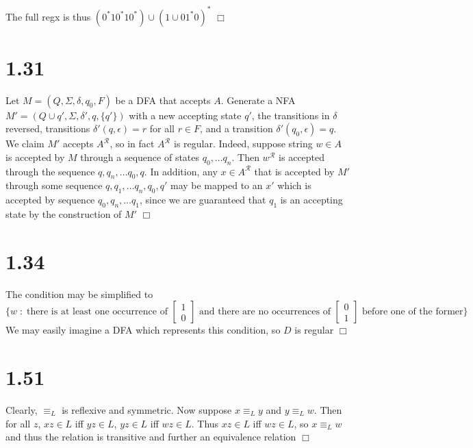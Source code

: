 \documentclass{article}
\begin{document}
\noindent
The full regx is thus $(0^*10^*10^*)\cup(1\cup01^*0)^*$ $\Box$

\section*{1.31}
Let $M = (Q,\Sigma,\delta,q_0,F)$ be a DFA that accepts $A$. Generate a NFA $M' = (Q\cup{q'}, \Sigma, \delta',q,\{q'\})$ with a new accepting state $q'$, the transitions in $\delta$ reversed, transitions $\delta'(q,\epsilon) = r$ for all $r \in F$, and a transition $\delta'(q_0,\epsilon) = q$. We claim $M'$ accepts $A^\mathcal{R}$, so in fact $A^\mathcal{R}$ is regular. Indeed, suppose string $w \in A$ is accepted by $M$ through a sequence of states $q_0, \dots q_n$. Then $w^\mathcal{R}$ is accepted through the sequence $q,q_n,\dots q_0,q$. In addition, any $x \in A^\mathcal{R}$ that is accepted by $M'$ through some sequence $q,q_1,\dots q_n, q_0, q'$ may be mapped to an $x'$ which is accepted by sequence $q_0, q_n, \dots q_1$, since we are guaranteed that $q_1$ is an accepting state by the construction of $M'$ $\Box$

\section*{1.34}
The condition may be simplified to
$$\{w \;:\; \text{there is at least one occurrence of } \left[\begin{matrix}1\\0\end{matrix}\right] \text{ and there are no occurrences of } \left[\begin{matrix}0\\1\end{matrix}\right] \text{ before one of the former}\}$$
We may easily imagine a DFA which represents this condition, so $D$ is regular $\Box$

\section*{1.51}
Clearly, $\equiv_L$ is reflexive and symmetric. Now suppose $x\equiv_L y$ and $y \equiv_L w$. Then for all $z$, $xz \in L$ iff $yz \in L$, $yz \in L$ iff $wz \in L$. Thus $xz \in L$ iff $wz \in L$, so $x \equiv_L w$ and thus the relation is transitive and further an equivalence relation $\Box$
\end{document}

